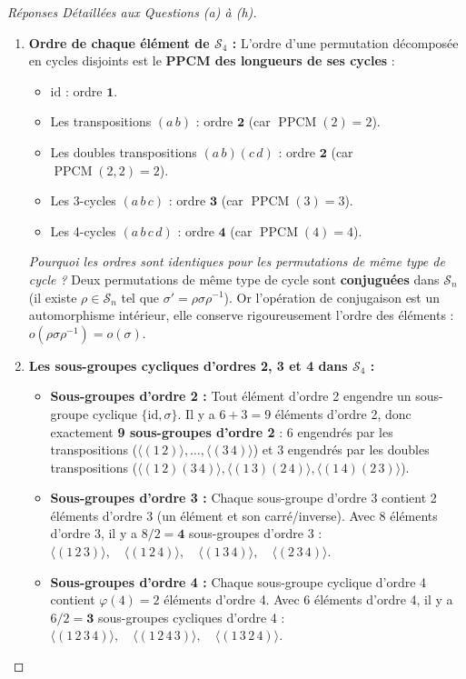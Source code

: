 \documentclass[12pt,a4paper]{report}
\begin{document}
\begin{proof}[Réponses Détaillées aux Questions (a) à (h)]
\begin{enumerate}
    \item[(f)] \textbf{Ordre de chaque élément de $\mathcal{S}_4$ :}  
    L'ordre d'une permutation décomposée en cycles disjoints est le \textbf{PPCM des longueurs de ses cycles} :
    \begin{itemize}
        \item $\mathrm{id}$ : ordre $\mathbf{1}$.
        \item Les transpositions $(a\,b)$ : ordre $\mathbf{2}$ (car $\operatorname{PPCM}(2) = 2$).
        \item Les doubles transpositions $(a\,b)(c\,d)$ : ordre $\mathbf{2}$ (car $\operatorname{PPCM}(2, 2) = 2$).
        \item Les 3-cycles $(a\,b\,c)$ : ordre $\mathbf{3}$ (car $\operatorname{PPCM}(3) = 3$).
        \item Les 4-cycles $(a\,b\,c\,d)$ : ordre $\mathbf{4}$ (car $\operatorname{PPCM}(4) = 4$).
    \end{itemize}
    \textit{Pourquoi les ordres sont identiques pour les permutations de même type de cycle ?}  
    Deux permutations de même type de cycle sont \textbf{conjuguées} dans $\mathcal{S}_n$ (il existe $\rho \in \mathcal{S}_n$ tel que $\sigma' = \rho \sigma \rho^{-1}$). Or l'opération de conjugaison est un automorphisme intérieur, elle conserve rigoureusement l'ordre des éléments : $o(\rho \sigma \rho^{-1}) = o(\sigma)$.

    \item[(g)] \textbf{Les sous-groupes cycliques d'ordres 2, 3 et 4 dans $\mathcal{S}_4$ :}
    \begin{itemize}
        \item \textbf{Sous-groupes d'ordre 2 :} Tout élément d'ordre 2 engendre un sous-groupe cyclique $\{ \mathrm{id}, \sigma \}$. Il y a $6 + 3 = 9$ éléments d'ordre 2, donc exactement \textbf{9 sous-groupes d'ordre 2} :  
        6 engendrés par les transpositions ($\langle (1\,2) \rangle, \dots, \langle (3\,4) \rangle$) et 3 engendrés par les doubles transpositions ($\langle (1\,2)(3\,4) \rangle, \langle (1\,3)(2\,4) \rangle, \langle (1\,4)(2\,3) \rangle$).
        \item \textbf{Sous-groupes d'ordre 3 :} Chaque sous-groupe d'ordre 3 contient 2 éléments d'ordre 3 (un élément et son carré/inverse). Avec 8 éléments d'ordre 3, il y a $8/2 = \mathbf{4}$ sous-groupes d'ordre 3 :  
        $\langle (1\,2\,3) \rangle, \quad \langle (1\,2\,4) \rangle, \quad \langle (1\,3\,4) \rangle, \quad \langle (2\,3\,4) \rangle$.
        \item \textbf{Sous-groupes d'ordre 4 :} Chaque sous-groupe cyclique d'ordre 4 contient $\varphi(4) = 2$ éléments d'ordre 4. Avec 6 éléments d'ordre 4, il y a $6/2 = \mathbf{3}$ sous-groupes cycliques d'ordre 4 :  
        $\langle (1\,2\,3\,4) \rangle, \quad \langle (1\,2\,4\,3) \rangle, \quad \langle (1\,3\,2\,4) \rangle$.
    \end{itemize}


\end{enumerate}
\end{proof}
\end{document}
